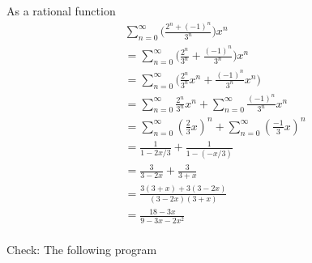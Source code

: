 As a rational function
\begin{align*}
&\sum_{n=0}^\infty \biggl( \frac{2^n + (-1)^n}{3^n}  \biggr) x^n \\
&= \sum_{n=0}^\infty \biggl( \frac{2^n}{3^n} + \frac{(-1)^n}{3^n}  \biggr) x^n \\
&= \sum_{n=0}^\infty \biggl( \frac{2^n}{3^n}x^n + \frac{(-1)^n}{3^n}x^n  \biggr) \\
&= \sum_{n=0}^\infty \frac{2^n}{3^n}x^n + \sum_{n=0}^\infty \frac{(-1)^n}{3^n}x^n \\
&= \sum_{n=0}^\infty \left(\frac{2}{3}x\right)^n
+ \sum_{n=0}^\infty \left(\frac{-1}{3}x \right)^n \\
&= \frac{1}{1 - 2x/3} + \frac{1}{1 - (-x/3)} \\
&= \frac{3}{3 - 2x} + \frac{3}{3  + x} \\
&= \frac{3(3 + x) + 3(3 - 2x)}{(3 - 2x)(3 + x)}  \\
&= \frac{18 - 3x}{9 - 3x - 2x^2}  \\
\end{align*}

Check:
The following program
